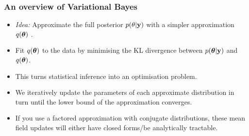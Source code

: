 \documentclass{beamer}
\begin{document}
\begin{frame}
	\frametitle{An overview of Variational Bayes}
	\begin{itemize}
		\item \emph{Idea:} Approximate the full posterior $p(\theta|{\bf y})$ with a simpler approximation $q({\boldsymbol \theta})$
					\cite{Ormerod2010}.
		      		      		      		      		      		      		      
		\item Fit $q({\boldsymbol \theta})$ to the data by minimising the KL divergence between $p({\boldsymbol \theta}|{\bf y})$ and $q({\boldsymbol \theta})$.

		\item This turns statistical inference into an optimisation problem.
		      		      		      		      		      		      		      
		\item We iteratively update the parameters of each approximate distribution
		      in turn until the lower bound of the approximation converges.
		      
		      		      		      		      		      		      		      
		      		      		      		      		      		      		      
		\item If you use a factored approximation with conjugate distributions, these mean field
			  updates will either have closed forms/be analytically tractable.
	\end{itemize}
\end{frame}

						
\end{document}
